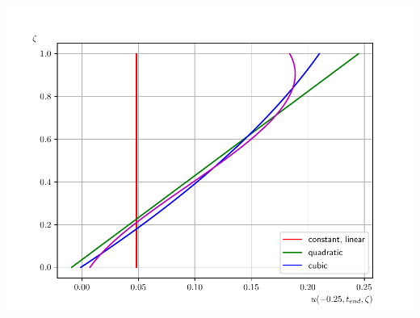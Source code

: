 \documentclass[10pt]{beamer}
\begin{document}
\begin{frame}
  \includegraphics[scale=0.29]{Figures/velocity_profile_-025_torrilhon.pdf}
\end{frame}
\end{document}
